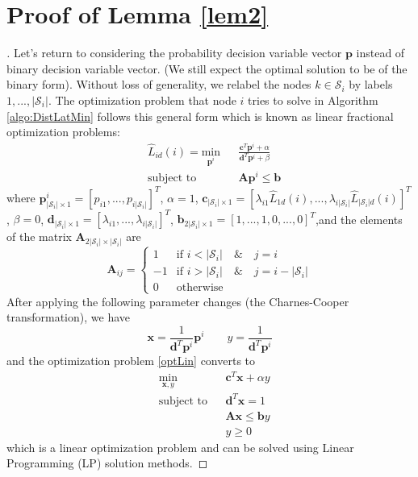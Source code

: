 \documentclass[journal,onecolumn,11pt]{IEEEtran}
\theoremstyle{plain}
\theoremstyle{definition}
\def\bp{{\mathbf p}}
\def\bx{{\mathbf x}}
\def\cS{{\mathcal S}}
\begin{document}
\section{Proof of Lemma \ref{lem2}}\label{pl2}
\begin{proof}[\unskip\nopunct]
  Let's return to considering the probability decision variable vector
  $\bp$ instead of binary decision variable vector. (We still expect
  the optimal solution to be of the binary form). Without loss of
  generality, we relabel the nodes $k \in \cS_i$ by labels
  $1,...,|\cS_i|$. The optimization problem that node $i$ tries to
  solve in Algorithm \ref{algo:DistLatMin} follows this general form
  which is known as linear fractional optimization problems:
\begin{equation}\label{optLin}
\begin{aligned}
& \widehat{L}_{id}(i)=\underset{\mathbf{p}^i}{\text{min}}
& & \frac{\mathbf{c}^T \mathbf{p}^i +\alpha}{\mathbf{d}^T \mathbf{p}^i +\beta} \\
& \text{subject to}
& & \mathbf{A}\mathbf{p}^i\leq \mathbf{b}
\end{aligned}
\end{equation}
where $\mathbf{p}^i_{|\cS_i| \times 1}=[p_{i1},...,p_{i|\cS_i|}]^T$, $\alpha=1$,
$\mathbf{c}_{|\cS_i| \times 1}=[\lambda_{i1}\widehat{L}_{1d}(i),...,\lambda_{i|\cS_i|} \widehat{L}_{|\cS_i|d}(i)]^T$,  $\beta=0$, 
 $\mathbf{d}_{|\cS_i| \times 1}=[\lambda_{i1},...,\lambda_{i|\cS_i|}]^T$, $\mathbf{b}_{2|\cS_i| \times 1}=[1,...,1,0,...,0]^T$,and the elements of the matrix $\mathbf{A}_{2|\cS_i| \times |\cS_i|}$ are
\[
 \mathbf{A}_{ij} =
  \begin{cases}
   1 & \text{if } i<|\cS_i| \quad \& \quad j=i \\
   -1 & \text{if } i>|\cS_i| \quad \& \quad j=i-|\cS_i| \\
   0       & \text{otherwise }
  \end{cases}
\]
After applying the following parameter changes (the Charnes-Cooper transformation), we have
\begin{equation}
\bx=\frac{1}{\mathbf{d}^T\bp^i}\bp^i \qquad y=\frac{1}{\mathbf{d}^T\bp^i}
\end{equation}
and the optimization problem \ref{optLin} converts to
\begin{equation}
\begin{aligned}
& \underset{\mathbf{x},y}{\text{min}}
& & \mathbf{c}^T\mathbf{x}+\alpha y \\
& \text{subject to}
& & \mathbf{d}^T\mathbf{x}=1\\
& & & \mathbf{A}\mathbf{x} \leq \mathbf{b}y\\
& & & y\geq 0
\end{aligned}
\end{equation}
which is a linear optimization problem and can be solved using Linear Programming (LP) solution methods.
\end{proof}
\end{document}
